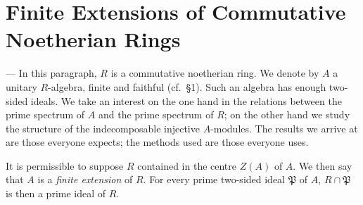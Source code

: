 %
%

\section{Finite Extensions of Commutative Noetherian Rings}

--- In this paragraph, $R$ is a commutative noetherian ring. We denote
by $A$ a unitary $R$-algebra, finite and faithful (cf.~\S1). Such an
algebra has enough two-sided ideals. We take an interest on the one
hand in the relations between the prime spectrum of $A$ and the prime
spectrum of $R$; on the other hand we study the structure of the
indecomposable injective $A$-modules. The results we arrive at are
those everyone expects; the methods used are those everyone uses.

It is permissible to suppose $R$ contained in the centre $Z(A)$ of
$A$. We then say that $A$ is a \emph{finite extension} of $R$. For
every prime two-sided ideal $\mathfrak{P}$ of $A$, $R\cap\mathfrak{P}$
is then a prime ideal of $R$.


